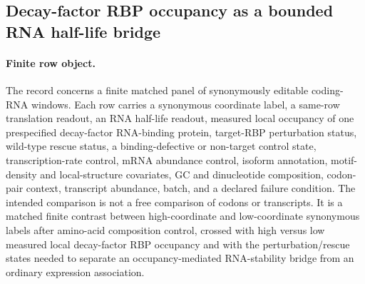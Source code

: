 \subsection{Decay-factor RBP occupancy as a bounded RNA half-life bridge}
\label{subsec:decay-factor-rbp-rna-half-life-with-translation-boundary-cross-layer}

\paragraph{Finite row object.}
The record concerns a finite matched panel of synonymously editable coding-RNA windows.  Each row carries a synonymous coordinate label, a same-row translation readout, an RNA half-life readout, measured local occupancy of one prespecified decay-factor RNA-binding protein, target-RBP perturbation status, wild-type rescue status, a binding-defective or non-target control state, transcription-rate control, mRNA abundance control, isoform annotation, motif-density and local-structure covariates, GC and dinucleotide composition, codon-pair context, transcript abundance, batch, and a declared failure condition.  The intended comparison is not a free comparison of codons or transcripts.  It is a matched finite contrast between high-coordinate and low-coordinate synonymous labels after amino-acid composition control, crossed with high versus low measured local decay-factor RBP occupancy and with the perturbation/rescue states needed to separate an occupancy-mediated RNA-stability bridge from an ordinary expression association.

